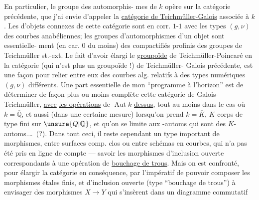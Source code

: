En particulier, le groupe des automorphis-
mes de $k$ opère sur la catégorie précédente,
que j'ai envie d'appeler la \uline{catégorie de
Teichmüller-Galois} associée à $k$. Les
  d'objets connexes de cette
catégorie sont en corr. $1$-$1$ avec les types
$(g,\nu)$ des courbes anabéliennes; les groupes
d'automorphismes d'un objet sont essentielle-
ment (en car. $0$ du moins) des compactifiés
profinis des groupes de Teichmüller st.-ext.
Le fait d'avoir élargi le \uline{groupoïde} de
Teichmüller-Poincaré en la catégorie (qui n'est
plus un groupoïde !) de Teichmüller-
Galois précédente, est une façon  
pour relier entre eux des courbes alg. relatifs
à des types numériques $(g,\nu)$ différents.
Une part essentielle de mon ``programme
à l'horizon'' est de déterminer de façon
plus ou moins complète cette catégorie
de Galois-Teichmüller,  \uline{avec} \uline{les opérations}
de $\operatorname{Aut}k$ \uline{dessus}, tout au moins dans
le cas où $k=\overline{\mathbb Q}$, et aussi (dans une
certaine mesure) lorsqu'on prend 
$k=\overline K$, $K$ corps de type fini sur $\unsure{Q|\mathbb Q}$, et
qu'on se limite aux -automs  qui
sont des $K$-automs.\ldots\ (?).
Dans tout ceci, il reste cependant un
type important de  morphismes, entre
surfaces  comp. clos ou entre schémas en
courbes, qui n'a pas été pris en ligne
de compte --- savoir les morphismes
d'inclusion ouverte
correspondants à une opération de \uline{bouchage
de trous}. Mais on est confronté, pour élargir la
catégorie en conséquence, par l'impératif de
pouvoir composer les morphismes étales finis,
et d'inclusion ouverte (type ``bouchage de trous'')
à envisager des morphismes $X\longrightarrow Y$ qui
s'insèrent dans un diagramme commutatif
